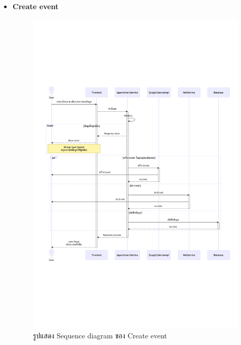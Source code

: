 \documentclass[12pt,oneside,openright,a4paper]{cpe-thai-project}
\begin{document}
\begin{itemize}
    \newpage
    \item \textbf{Create event} \\
    \begin{figure}[!ht]\centering
        \includegraphics[width=13cm, trim={0 7cm 0 7cm},clip]{./assets/sequence-diagram/create-event.png}
        \caption{รูปแสดง Sequence diagram ของ Create event}\label{fig:sqCraeteEvent}
    \end{figure}


\end{itemize}
\end{document}
